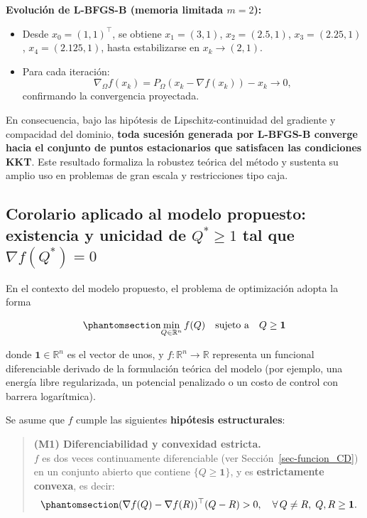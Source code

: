 \documentclass[
  spanish,
  us-letterpaper,
]{scrreprt}
\providecommand{\tightlist}{%
  \setlength{\itemsep}{0pt}\setlength{\parskip}{0pt}}
\numberwithin{equation}{section}
\begin{document}
\textbf{Evolución de L-BFGS-B (memoria limitada \(m = 2\)):}

\begin{itemize}
\tightlist
\item
  Desde \(x_0 = (1,1)^\top\), se obtiene \(x_1 = (3,1)\),
  \(x_2 = (2.5,1)\), \(x_3 = (2.25,1)\), \(x_4 = (2.125,1)\), hasta
  estabilizarse en \(x_k \to (2,1)\).
\item
  Para cada iteración: \[
  \nabla_\Omega f(x_k) = P_\Omega(x_k - \nabla f(x_k)) - x_k \to 0,
  \] confirmando la convergencia proyectada.
\end{itemize}

En consecuencia, bajo las hipótesis de Lipschitz-continuidad del
gradiente y compacidad del dominio, \textbf{toda sucesión generada por
L-BFGS-B converge hacia el conjunto de puntos estacionarios que
satisfacen las condiciones KKT}. Este resultado formaliza la robustez
teórica del método y sustenta su amplio uso en problemas de gran escala
y restricciones tipo caja.

\subsection{\texorpdfstring{Corolario aplicado al modelo propuesto:
existencia y unicidad de \(Q^* \ge 1\) tal que
\(\nabla f(Q^*) = 0\)}{Corolario aplicado al modelo propuesto: existencia y unicidad de Q\^{}* \textbackslash ge 1 tal que \textbackslash nabla f(Q\^{}*) = 0}}\label{corolario-aplicado-al-modelo-propuesto-existencia-y-unicidad-de-q-ge-1-tal-que-nabla-fq-0}

En el contexto del modelo propuesto, el problema de optimización adopta
la forma

\begin{equation}\phantomsection\label{eq-min_Q_restriccion}{
\min_{Q \in \mathbb{R}^n} f(Q)
\quad \text{sujeto a} \quad Q \geq \mathbf{1}
}\end{equation}

donde \(\mathbf{1} \in \mathbb{R}^n\) es el vector de unos, y
\(f : \mathbb{R}^n \to \mathbb{R}\) representa un funcional
diferenciable derivado de la formulación teórica del modelo (por
ejemplo, una energía libre regularizada, un potencial penalizado o un
costo de control con barrera logarítmica).

Se asume que \(f\) cumple las siguientes \textbf{hipótesis
estructurales}:

\begin{quote}
\textbf{(M1) Diferenciabilidad y convexidad estricta.}\\
\(f\) es dos veces continuamente diferenciable (ver
Sección~\ref{sec-funcion_CD}) en un conjunto abierto que contiene
\(\{Q \ge \mathbf{1}\}\), y es \textbf{estrictamente convexa}, es decir:
\begin{equation}\phantomsection\label{eq-76}{
(\nabla f(Q) - \nabla f(R))^\top (Q - R) > 0, \quad \forall\, Q \neq R,\; Q,R \ge \mathbf{1}. 
}\end{equation}
\end{quote}
\end{document}
